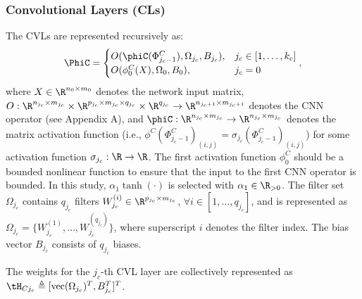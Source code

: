 \documentclass[conference]{IEEEtran}
\begin{document}
\subsubsection{Convolutional Layers (CLs)}
The CVLs are represented recursively as:
\begin{equation}\label{eq:cvl_output}
    \PhiC 
    = 
    \begin{cases} 
            O(\phiC(\Phi_{j_c-1}^{C}),
            \Omega_{j_c},B_{j_c}), 
            & 
            j_c \in [1,\dots,k_c] \\ 
            O(\phi_{0}^{C}(X),\Omega_{0},B_{0}), 
            & 
            j_c = 0 
    \end{cases}
    ,
\end{equation}
where 
$X \in \R^{n_0 \times m_0}$ denotes the network input matrix, 
$O:\R^{n_{j_c} \times m_{j_c}} \times \R^{p_{j_c} \times m_{j_c}
  \times q_{j_c}} \times \R^{q_{j_c}} \to \R^{n_{j_c+1} \times
  m_{j_c+1}}$ denotes the CNN operator (see Appendix A), and 
$\phiC:\R^{n_{j_c} \times m_{j_c}} \to \R^{n_{j_c} \times m_{j_c}}$
denotes the matrix activation function 
(i.e., $\phi^C(\Phi_{j_c-1}^{C})_{(i,j)} = \sigma_{j_c}(\Phi_{j_c-1}^{C})_{(i,j)}$) for some activation function $\sigma_{j_c}: \R \to \R$. 
The first activation function $\phi_{0}^{C}$ should be a bounded nonlinear function to ensure that the input to the first CNN operator is bounded. 
In this study, $\alpha_1 \tanh(\cdot)$ is selected with $\alpha_1 \in \R_{>0}$. 
The filter set $\Omega_{j_c}$ contains $q_{j_c}$ filters $W_{j_c}^{(i)} \in \R^{p_{j_c} \times
  m_{j_c}}$, $\forall i \in [1,\dots,q_{j_c}]$, and is represented as
$\Omega_{j_c} = \{W_{j_c}^{(1)},\dots,W_{j_c}^{(q_{j_c})}\}$, where superscript
$i$ denotes the filter index. The bias vector $B_{j_c}$ consists of $q_{j_c}$ biases.

The weights for the $j_c$-th CVL layer are collectively represented as
$\tH_{Cj_c} \triangleq [\text{vec}(\Omega_{j_c})^T, B_{j_c}^T]^T$.
\end{document}
